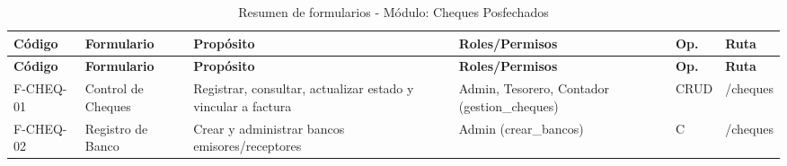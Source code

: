 {
\small
{}
\setlength{\parindent}{0pt}
\begin{xltabular}{\linewidth}{
    >{\raggedright\arraybackslash}p{1.8cm} 
    >{\raggedright\arraybackslash}p{2.8cm} 
    >{\raggedright\arraybackslash}X 
    >{\raggedright\arraybackslash}p{2.5cm} 
    >{\centering\arraybackslash}p{0.8cm} 
    >{\raggedright\arraybackslash}p{2.0cm}
}

    \caption{Resumen de formularios - Módulo: Cheques Posfechados} \label{tab:cap4_cheques_resumen} \\
    \toprule
    \textbf{Código} & \textbf{Formulario} & \textbf{Propósito} & \textbf{Roles/Permisos} & \textbf{Op.} & \textbf{Ruta} \\
    \midrule
    \endfirsthead

    \toprule
    \textbf{Código} & \textbf{Formulario} & \textbf{Propósito} & \textbf{Roles/Permisos} & \textbf{Op.} & \textbf{Ruta} \\
    \midrule
    \endhead

    \endfoot

\bottomrule
\endlastfoot

    F-CHEQ-01 & Control de Cheques & Registrar, consultar, actualizar estado y vincular a factura & Admin, Tesorero, Contador (\textrm{gestion\_cheques}) & CRUD & \textrm{/cheques} \\
    \addlinespace
    F-CHEQ-02 & Registro de Banco & Crear y administrar bancos emisores/receptores & Admin (\textrm{crear\_bancos}) & C & \textrm{/cheques} \\
\end{xltabular}
}

